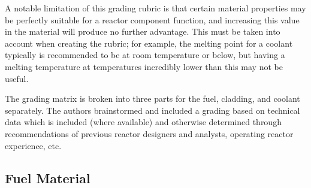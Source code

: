 \documentclass[]{report}
\begin{document}
A notable limitation of this grading rubric is that certain material properties may be perfectly suitable for a reactor component function, and increasing this value in the material will produce no further advantage.  This must be taken into account when creating the rubric; for example, the melting point for a coolant typically is recommended to be at room temperature or below, but having a melting temperature at temperatures incredibly lower than this may not be useful.

The grading matrix is broken into three parts for the fuel, cladding, and coolant separately.  The authors brainstormed and included a grading based on technical data which is included (where available) and otherwise determined through recommendations of previous reactor designers and analysts, operating reactor experience, etc.

\subsection{Fuel Material}
\end{document}

